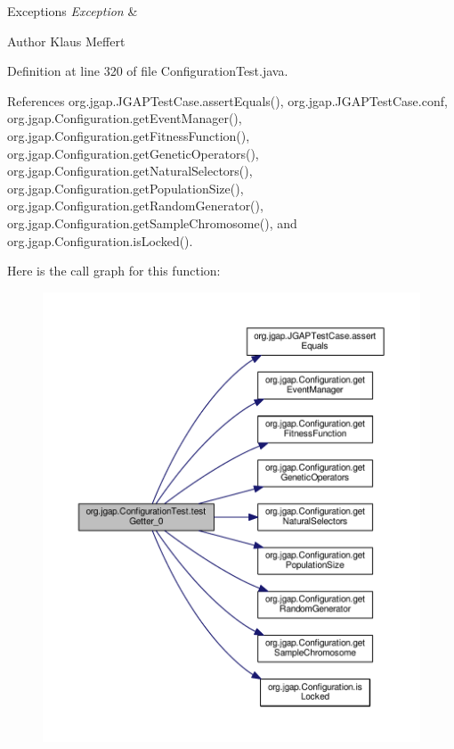 \begin{DoxyExceptions}{Exceptions}
{\em Exception} & \\
\hline
\end{DoxyExceptions}
\begin{DoxyAuthor}{Author}
Klaus Meffert 
\end{DoxyAuthor}


Definition at line 320 of file Configuration\-Test.\-java.



References org.\-jgap.\-J\-G\-A\-P\-Test\-Case.\-assert\-Equals(), org.\-jgap.\-J\-G\-A\-P\-Test\-Case.\-conf, org.\-jgap.\-Configuration.\-get\-Event\-Manager(), org.\-jgap.\-Configuration.\-get\-Fitness\-Function(), org.\-jgap.\-Configuration.\-get\-Genetic\-Operators(), org.\-jgap.\-Configuration.\-get\-Natural\-Selectors(), org.\-jgap.\-Configuration.\-get\-Population\-Size(), org.\-jgap.\-Configuration.\-get\-Random\-Generator(), org.\-jgap.\-Configuration.\-get\-Sample\-Chromosome(), and org.\-jgap.\-Configuration.\-is\-Locked().



Here is the call graph for this function\-:
\nopagebreak
\begin{figure}[H]
\begin{center}
\leavevmode
\includegraphics[width=350pt]{classorg_1_1jgap_1_1_configuration_test_a17752be2dd0b9da193f931c86406dbbf_cgraph}
\end{center}
\end{figure}


